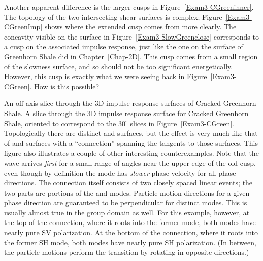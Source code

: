 Another apparent difference is the larger cusps in
Figure~\ref{Exam3-CGreeninner}.
The topology of the two intersecting shear surfaces is complex;
Figure~\ref{Exam3-CGreenImp} shows where the extended cusp comes
from more clearly.
The concavity visible on the {} surface
in Figure~\ref{Exam3-SlowGreenclose} corresponds to a cusp on
the associated impulse response,
just like the one on the {\qSV} surface of Greenhorn Shale did in
Chapter~\ref{Chap-2D}.
This cusp comes from a small region of the slowness
surface, and so should not be too significant energetically.
However,
this cusp is exactly what we were seeing back in Figure~\ref{Exam3-CGreen}.
%
% 
How is this possible?

{An off-axis slice through the 3D impulse-response surfaces
of Cracked Greenhorn Shale.}
{
A slice through the 3D impulse response surface for
Cracked Greenhorn Shale, oriented to correspond to
the $30^\circ$ slices in Figure~\protect\ref{Exam3-CGreen}.
Topologically there are distinct {} and {} surfaces,
but the effect is very much like that of {\qSV} and {\qSH} surfaces
with a ``connection'' spanning the tangents to those surfaces.
This figure also illustrates a couple of other interesting counterexamples.
Note that the {} wave arrives {\em first} for a small range
of angles near the upper edge of the old {\qSV} cusp, even though
by definition the {} mode has {\em slower} phase velocity
for all phase directions.
The connection itself consists of two closely spaced linear events;
the two parts are portions of the {} and {} modes.
Particle-motion directions for a given phase direction are guaranteed
to be perpendicular for distinct modes. This is usually almost true
in the group domain as well. For this example, however,
at the top of the connection, where it roots into the former {\qSV}
mode, both modes have nearly pure SV polarization. At the bottom
of the connection, where it roots into the former SH mode,
both modes have nearly pure SH polarization. (In between, the particle
motions perform the transition by rotating in opposite directions.)
}

